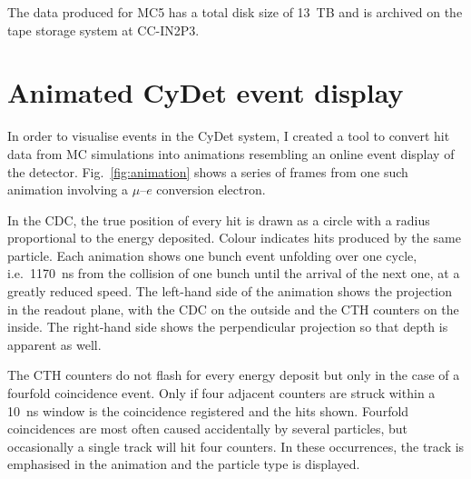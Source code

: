 The data produced for MC5 has a total disk size of \SI{13}{TB} and is archived on the tape storage system at CC-IN2P3.

\section{Animated CyDet event display}
In order to visualise events in the CyDet system, I created a tool to convert hit data from MC simulations into animations resembling an online event display of the detector. Fig.~\ref{fig:animation} shows a series of frames from one such animation involving a $\mu$--$e$ conversion electron.

In the CDC, the true position of every hit is drawn as a circle with a radius proportional to the energy deposited. Colour indicates hits produced by the same particle. Each animation shows one bunch event unfolding over one cycle, i.e.\ \SI{1170}{\ns} from the collision of one bunch until the arrival of the next one, at a greatly reduced speed.
The left-hand side of the animation shows the projection in the readout plane, with the CDC on the outside and the CTH counters on the inside. The right-hand side shows the perpendicular projection so that depth is apparent as well.

The CTH counters do not flash for every energy deposit but only in the case of a fourfold coincidence event. Only if four adjacent counters are struck within a \SI{10}{\ns} window is the coincidence registered and the hits shown. Fourfold coincidences are most often caused accidentally by several particles, but occasionally a single track will hit four counters. In these occurrences, the track is emphasised in the animation and the particle type is displayed.

